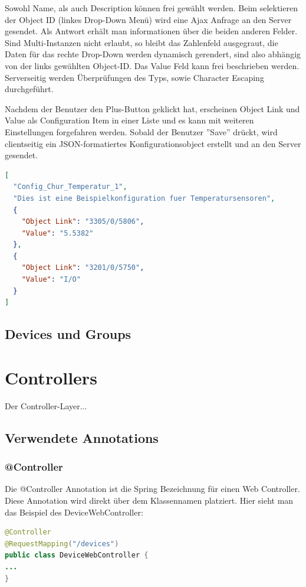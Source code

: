 Sowohl Name, als auch Description können frei gewählt werden. Beim selektieren der Object ID (linkes Drop-Down Menü) wird eine Ajax Anfrage an den Server gesendet. Als Antwort erhält man informationen über die beiden anderen Felder. Sind Multi-Instanzen nicht erlaubt, so bleibt das Zahlenfeld ausgegraut, die Daten für das rechte Drop-Down werden dynamisch gerendert, sind also abhängig von der links gewählten Object-ID. Das Value Feld kann frei beschrieben werden. Serverseitig werden Überprüfungen des Typs, sowie Character Escaping durchgeführt.

Nachdem der Benutzer den Plus-Button geklickt hat, erscheinen Object Link und Value als Configuration Item in einer Liste und es kann mit weiteren Einstellungen forgefahren werden. Sobald der Benutzer ''Save'' drückt, wird clientseitig ein JSON-formatiertes Konfigurationsobject erstellt und an den Server gesendet.

\begin{lstlisting}[language=json]
[
  "Config_Chur_Temperatur_1", 
  "Dies ist eine Beispielkonfiguration fuer Temperatursensoren", 
  {
	"Object Link": "3305/0/5806",
	"Value": "5.5382"
  }, 
  {
	"Object Link": "3201/0/5750",
	"Value": "I/O"
  }
]
\end{lstlisting}



\subsection{Devices und Groups}







\newpage

\section{Controllers}
Der Controller-Layer... %

\subsection{Verwendete Annotations}
\subsubsection{@Controller}
Die @Controller Annotation ist die Spring Bezeichnung für einen Web Controller. Diese Annotation wird direkt über dem Klassennamen platziert. Hier sieht man das Beispiel des DeviceWebController:
\begin{lstlisting}[language=java]
@Controller
@RequestMapping("/devices")
public class DeviceWebController {
...
}
\end{lstlisting}

